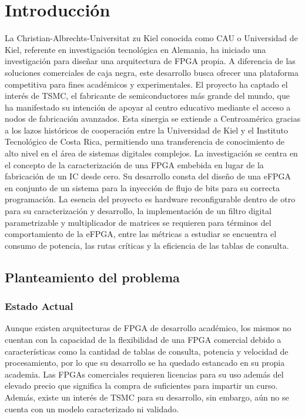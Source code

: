 
\chapter{Introducción}
\label{chp:intro}

La Christian-Albrechts-Universitat zu Kiel conocida como CAU o Universidad de Kiel,
referente en investigación tecnológica en Alemania, ha iniciado una investigación para
diseñar una arquitectura de FPGA propia. A diferencia de las soluciones comerciales de
caja negra, este desarrollo busca ofrecer una plataforma competitiva para fines académicos
y experimentales.
El proyecto ha captado el interés de TSMC, el fabricante de semiconductores más grande
del mundo, que ha manifestado su intención de apoyar al centro educativo mediante el
acceso a nodos de fabricación avanzados. Esta sinergia se extiende a Centroamérica gracias
a los lazos históricos de cooperación entre la Universidad de Kiel y el Instituto Tecnológico
de Costa Rica, permitiendo una transferencia de conocimiento de alto nivel en el área de
sistemas digitales complejos.
La investigación se centra en el concepto de la caracterización de una FPGA embebida
en lugar de la fabricación de un IC desde cero. Su desarrollo consta del diseño de una
eFPGA en conjunto de un sistema para la inyección de flujo de bits para su correcta
programación. La esencia del proyecto es hardware reconfigurable dentro de otro para
su caracterización y desarrollo, la implementación de un filtro digital parametrizable y multiplicador de matrices se
requieren para términos del comportamiento de la eFPGA, entre las métricas a estudiar
se encuentra el consumo de potencia, las rutas críticas y la eficiencia de las tablas de
consulta.

\section{Planteamiento del problema}

\subsection{Estado Actual}
 Aunque existen arquitecturas de FPGA de desarrollo académico, los mismos no cuentan
con la capacidad de la flexibilidad de una FPGA comercial debido a características como
la cantidad de tablas de consulta, potencia y velocidad de procesamiento, por lo que su 
desarrollo se ha quedado estancado en su propia academia. Las FPGAs comerciales
requieren licencias para su uso además del elevado precio que significa la compra de
suficientes para impartir un curso. Además, existe un interés de TSMC para su desarrollo,
sin embargo, aún no se cuenta con un modelo caracterizado ni validado.

